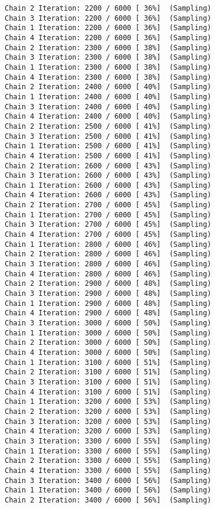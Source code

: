 \documentclass[
  letterpaper,
]{article}
\begin{document}
\begin{verbatim}
Chain 2 Iteration: 2200 / 6000 [ 36%]  (Sampling) 
Chain 3 Iteration: 2200 / 6000 [ 36%]  (Sampling) 
Chain 1 Iteration: 2200 / 6000 [ 36%]  (Sampling) 
Chain 4 Iteration: 2200 / 6000 [ 36%]  (Sampling) 
Chain 2 Iteration: 2300 / 6000 [ 38%]  (Sampling) 
Chain 3 Iteration: 2300 / 6000 [ 38%]  (Sampling) 
Chain 1 Iteration: 2300 / 6000 [ 38%]  (Sampling) 
Chain 4 Iteration: 2300 / 6000 [ 38%]  (Sampling) 
Chain 2 Iteration: 2400 / 6000 [ 40%]  (Sampling) 
Chain 1 Iteration: 2400 / 6000 [ 40%]  (Sampling) 
Chain 3 Iteration: 2400 / 6000 [ 40%]  (Sampling) 
Chain 4 Iteration: 2400 / 6000 [ 40%]  (Sampling) 
Chain 2 Iteration: 2500 / 6000 [ 41%]  (Sampling) 
Chain 3 Iteration: 2500 / 6000 [ 41%]  (Sampling) 
Chain 1 Iteration: 2500 / 6000 [ 41%]  (Sampling) 
Chain 4 Iteration: 2500 / 6000 [ 41%]  (Sampling) 
Chain 2 Iteration: 2600 / 6000 [ 43%]  (Sampling) 
Chain 3 Iteration: 2600 / 6000 [ 43%]  (Sampling) 
Chain 1 Iteration: 2600 / 6000 [ 43%]  (Sampling) 
Chain 4 Iteration: 2600 / 6000 [ 43%]  (Sampling) 
Chain 2 Iteration: 2700 / 6000 [ 45%]  (Sampling) 
Chain 1 Iteration: 2700 / 6000 [ 45%]  (Sampling) 
Chain 3 Iteration: 2700 / 6000 [ 45%]  (Sampling) 
Chain 4 Iteration: 2700 / 6000 [ 45%]  (Sampling) 
Chain 1 Iteration: 2800 / 6000 [ 46%]  (Sampling) 
Chain 2 Iteration: 2800 / 6000 [ 46%]  (Sampling) 
Chain 3 Iteration: 2800 / 6000 [ 46%]  (Sampling) 
Chain 4 Iteration: 2800 / 6000 [ 46%]  (Sampling) 
Chain 2 Iteration: 2900 / 6000 [ 48%]  (Sampling) 
Chain 3 Iteration: 2900 / 6000 [ 48%]  (Sampling) 
Chain 1 Iteration: 2900 / 6000 [ 48%]  (Sampling) 
Chain 4 Iteration: 2900 / 6000 [ 48%]  (Sampling) 
Chain 3 Iteration: 3000 / 6000 [ 50%]  (Sampling) 
Chain 1 Iteration: 3000 / 6000 [ 50%]  (Sampling) 
Chain 2 Iteration: 3000 / 6000 [ 50%]  (Sampling) 
Chain 4 Iteration: 3000 / 6000 [ 50%]  (Sampling) 
Chain 1 Iteration: 3100 / 6000 [ 51%]  (Sampling) 
Chain 2 Iteration: 3100 / 6000 [ 51%]  (Sampling) 
Chain 3 Iteration: 3100 / 6000 [ 51%]  (Sampling) 
Chain 4 Iteration: 3100 / 6000 [ 51%]  (Sampling) 
Chain 1 Iteration: 3200 / 6000 [ 53%]  (Sampling) 
Chain 2 Iteration: 3200 / 6000 [ 53%]  (Sampling) 
Chain 3 Iteration: 3200 / 6000 [ 53%]  (Sampling) 
Chain 4 Iteration: 3200 / 6000 [ 53%]  (Sampling) 
Chain 3 Iteration: 3300 / 6000 [ 55%]  (Sampling) 
Chain 1 Iteration: 3300 / 6000 [ 55%]  (Sampling) 
Chain 2 Iteration: 3300 / 6000 [ 55%]  (Sampling) 
Chain 4 Iteration: 3300 / 6000 [ 55%]  (Sampling) 
Chain 3 Iteration: 3400 / 6000 [ 56%]  (Sampling) 
Chain 1 Iteration: 3400 / 6000 [ 56%]  (Sampling) 
Chain 2 Iteration: 3400 / 6000 [ 56%]  (Sampling) 

\end{verbatim}
\end{document}
